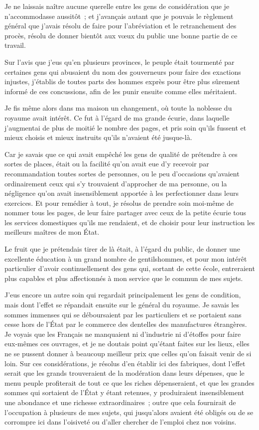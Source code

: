 \documentclass[french,twoside]{book} %
\begin{document}
Je ne laissais naître aucune querelle entre les gens de considération que je n’accommodasse aussitôt ; et j’avançais autant que je pouvais le règlement général que j’avais résolu de faire pour l’abréviation et le retranchement des procès, résolu de donner bientôt aux vœux du public une bonne partie de ce travail.\par
Sur l’avis que j’eus qu’en plusieurs provinces, le peuple était tourmenté par certaines gens qui abusaient du nom des gouverneurs pour faire des exactions injustes, j’établis de toutes parts des hommes exprès pour être plus sûrement informé de ces concussions, afin de les punir ensuite comme elles méritaient.\par
Je fis même alors dans ma maison un changement, où toute la noblesse du royaume avait intérêt. Ce fut à l’égard de ma grande écurie, dans laquelle j’augmentai de plus de moitié le nombre des pages, et pris soin qu’ils fussent et mieux choisis et mieux instruits qu’ils n’avaient été jusque-là.\par
Car je savais que ce qui avait empêché les gens de qualité de prétendre à ces sortes de places, était ou la facilité qu’on avait eue d’y recevoir par recommandation toutes sortes de personnes, ou le peu d’occasions qu’avaient ordinairement ceux qui s’y trouvaient d’approcher de ma personne, ou la négligence qu’on avait insensiblement apportée à les perfectionner dans leurs exercices. Et pour remédier à tout, je résolus de prendre soin moi-même de nommer tous les pages, de leur faire partager avec ceux de la petite écurie tous les services domestiques qu’ils me rendaient, et de choisir pour leur instruction les meilleurs maîtres de mon État.\par
Le fruit que je prétendais tirer de là était, à l’égard du public, de donner une excellente éducation à un grand nombre de gentilshommes, et pour mon intérêt particulier d’avoir continuellement des gens qui, sortant de cette école, entreraient plus capables et plus affectionnés à mon service que le commun de mes sujets.\par
J’eus encore un autre soin qui regardait principalement les gens de condition, mais dont l’effet se répandait ensuite sur le général du royaume. Je savais les sommes immenses qui se déboursaient par les particuliers et se portaient sans cesse hors de l’État par le commerce des dentelles des manufactures étrangères. Je voyais que les Français ne manquaient ni d’industrie ni d’étoffes pour faire eux-mêmes ces ouvrages, et je ne doutais point qu’étant faites sur les lieux, elles ne se pussent donner à beaucoup meilleur prix que celles qu’on faisait venir de si loin. Sur ces considérations, je résolus d’en établir ici des fabriques, dont l’effet serait que les grands trouveraient de la modération dans leurs dépenses, que le menu peuple profiterait de tout ce que les riches dépenseraient, et que les grandes sommes qui sortaient de l’État y étant retenues, y produiraient insensiblement une abondance et une richesse extraordinaires ; outre que cela fournirait de l’occupation à plusieurs de mes sujets, qui jusqu’alors avaient été obligés ou de se corrompre ici dans l’oisiveté ou d’aller chercher de l’emploi chez nos voisins.\par
\end{document}
